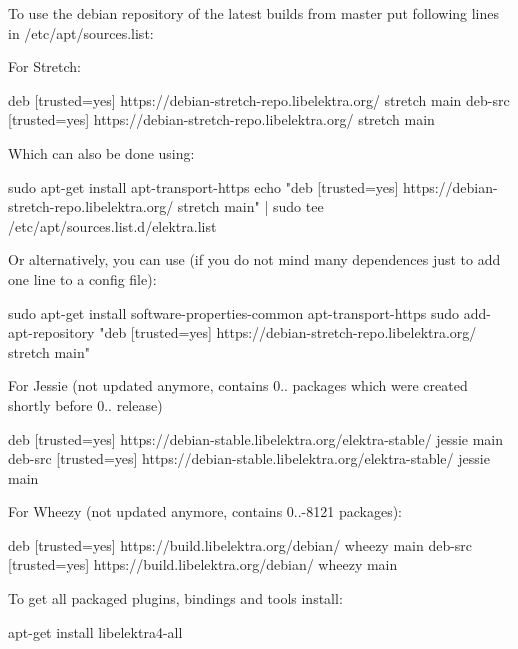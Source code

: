 To use the debian repository of the latest builds from master put following lines in {\ttfamily /etc/apt/sources.list}\+:

For Stretch\+:


\begin{DoxyCode}
deb     [trusted=yes] https://debian-stretch-repo.libelektra.org/ stretch main
deb-src [trusted=yes] https://debian-stretch-repo.libelektra.org/ stretch main
\end{DoxyCode}


Which can also be done using\+:


\begin{DoxyCode}
sudo apt-get install apt-transport-https
echo "deb     [trusted=yes] https://debian-stretch-repo.libelektra.org/ stretch main" | sudo tee
       /etc/apt/sources.list.d/elektra.list
\end{DoxyCode}


Or alternatively, you can use (if you do not mind many dependences just to add one line to a config file)\+:


\begin{DoxyCode}
sudo apt-get install software-properties-common apt-transport-https
sudo add-apt-repository "deb     [trusted=yes] https://debian-stretch-repo.libelektra.org/ stretch main"
\end{DoxyCode}


For Jessie (not updated anymore, contains 0.. packages which were created shortly before 0.. release)


\begin{DoxyCode}
deb     [trusted=yes] https://debian-stable.libelektra.org/elektra-stable/ jessie main
deb-src [trusted=yes] https://debian-stable.libelektra.org/elektra-stable/ jessie main
\end{DoxyCode}


For Wheezy (not updated anymore, contains 0..-\/8121 packages)\+:


\begin{DoxyCode}
deb     [trusted=yes] https://build.libelektra.org/debian/ wheezy main
deb-src [trusted=yes] https://build.libelektra.org/debian/ wheezy main
\end{DoxyCode}


To get all packaged plugins, bindings and tools install\+:


\begin{DoxyCode}
apt-get install libelektra4-all
\end{DoxyCode}


